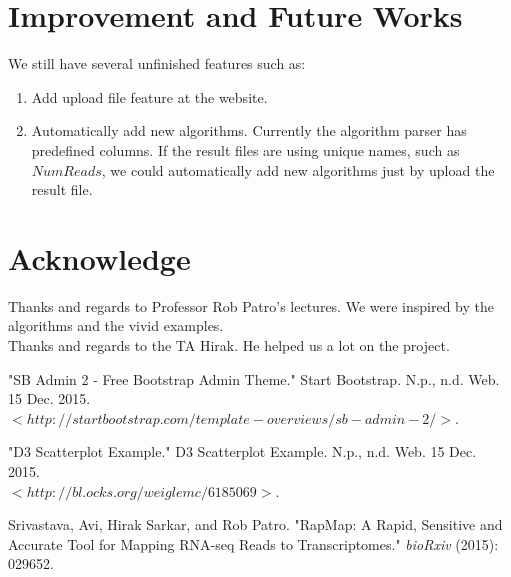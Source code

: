 \documentclass[11pt,letter]{article}
\begin{document}
\section{Improvement and Future Works}
We still have several unfinished features such as: \\
\begin{enumerate}
\item Add upload file feature at the website.
\item Automatically add new algorithms. Currently the algorithm parser has predefined columns. If the result files are using unique names, such as $NumReads$, we could automatically add new algorithms just by upload the result file.
\end{enumerate}


\section{Acknowledge}
Thanks and regards to Professor Rob Patro's lectures. We were inspired by the algorithms and the vivid examples. \\
Thanks and regards to the TA Hirak. He helped us a lot on the project.

% 


\begin{thebibliography}{100} %
 "SB Admin 2 - Free Bootstrap Admin Theme." Start Bootstrap. N.p., n.d. Web. 15 Dec. 2015.\\ $<http://startbootstrap.com/template-overviews/sb-admin-2/>$.

"D3 Scatterplot Example." D3 Scatterplot Example. N.p., n.d. Web. 15 Dec. 2015.\\ $<http://bl.ocks.org/weiglemc/6185069>$.

 Srivastava, Avi, Hirak Sarkar, and Rob Patro. "RapMap: A Rapid, Sensitive and Accurate Tool for Mapping RNA-seq Reads to Transcriptomes." \emph{bioRxiv} (2015): 029652.
\end{thebibliography}

% 
\end{document}
